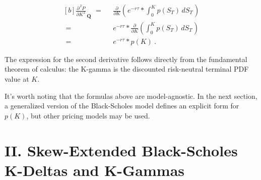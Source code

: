 \documentclass[12pt]{article}
\begin{document}
\vspace{5pt}

\begin{equation}
\begin{aligned}[b]
\frac{\partial^{\hspace{2pt} 2} P}{\partial K^{\hspace{1pt} 2}}_{\hspace{2pt} \mathbf{Q}}   \hspace{4pt} =& \hspace{7pt}   \frac{\partial}{\partial K}(\hspace{1pt}  e^{-r \tau} * \int_{0}^{K} p(S_{T}) \hspace{2pt} dS_{T} \hspace{1pt})
\\[12pt]
\hspace{4pt} =& \hspace{7pt}   e^{-r \tau} * \frac{\partial}{\partial K}(\int_{0}^{K} p(S_{T}) \hspace{2pt} dS_{T} \hspace{1pt})
\\[12pt]
\hspace{4pt} =& \hspace{7pt}   e^{-r \tau} * p(K) \hspace{3pt}.
\end{aligned}
\end{equation}

\vspace{5pt}

\begin{paragraph}
\indent The expression for the second derivative follows directly from the fundamental theorem of calculus: the K-gamma is the discounted risk-neutral terminal PDF value at $K$.
\end{paragraph}

\begin{paragraph}
\indent It's worth noting that the formulas above are model-agnostic. In the next section, a generalized version of the Black-Scholes model defines an explicit form for $p(K)$, but other pricing models may be used.
\end{paragraph}

\vspace{15pt}

\section*{\large II. \indent Skew-Extended Black-Scholes K-Deltas and K-Gammas}
\end{document}

